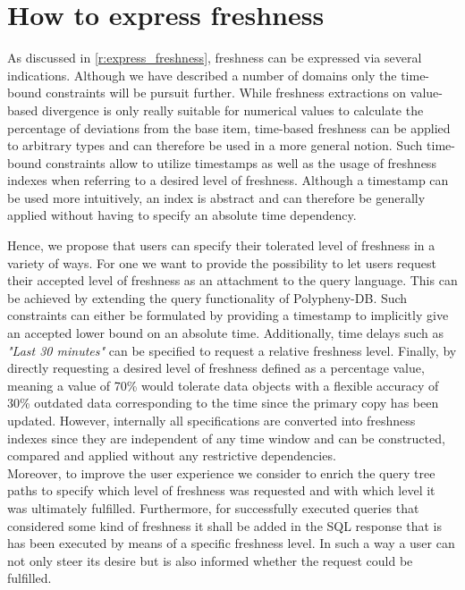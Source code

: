 \section{How to express freshness}
\label{express}

As discussed in \ref{r:express_freshness}, freshness can be expressed via several indications.
Although we have described a number of domains only the time-bound constraints will be pursuit further. 
While freshness extractions on value-based divergence is only really suitable for numerical values
to calculate the percentage of deviations from the base item, time-based freshness can be applied to arbitrary types and can therefore be used 
in a more general notion. 
Such time-bound constraints allow to utilize timestamps as well as the usage of freshness indexes when referring to a desired level of freshness. 
Although a timestamp can be used more intuitively, an index is abstract and can therefore be generally applied without having to specify an absolute time dependency.

Hence, we propose that users can specify their tolerated level of freshness in a variety of ways. For one we want to provide the possibility to let users 
request their accepted level of freshness as an attachment to the query language. This can be achieved by extending the query functionality of Polypheny-DB.
Such constraints can either be formulated by providing a timestamp to implicitly give an accepted lower bound on an absolute time.
Additionally, time delays such as \textit{"Last 30 minutes"} can be specified to request a relative freshness level.
Finally, by directly requesting a desired level of freshness defined as a percentage value, meaning a value of 70\% would tolerate data objects
with a flexible accuracy of 30\% outdated data corresponding to the time since the primary copy has been updated.
However, internally all specifications are converted into freshness indexes since they are independent of any time window and can be constructed, compared and applied 
without any restrictive dependencies.\\

Moreover, to improve the user experience we consider to enrich the query tree paths to specify which level of freshness was requested and with which level it was 
ultimately fulfilled. Furthermore, for successfully executed queries that considered some kind of freshness it shall be added in the SQL response that is has been 
executed by means of a specific freshness level.
In such a way a user can not only steer its desire but is also informed whether the request could be fulfilled.


